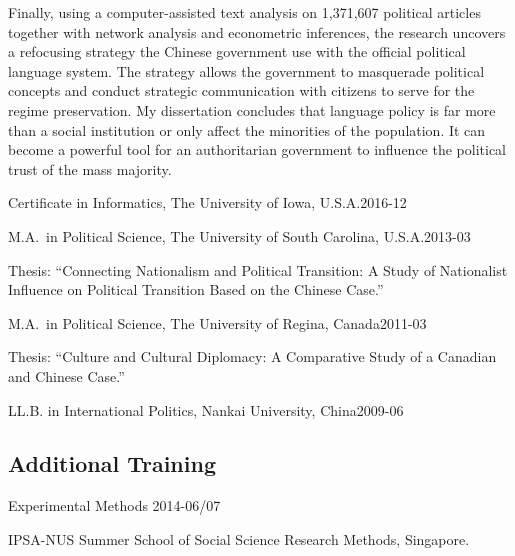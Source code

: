 \documentclass[10.5pt,]{article}
\providecommand{\tightlist}{%
	\setlength{\itemsep}{0pt}\setlength{\parskip}{0pt}}
\renewenvironment{itemize}{
	\begin{list}{}{
			\setlength{\leftmargin}{1.5em}
		}
	}{
	\end{list}
}
\begin{document}
\begin{itemize}
\begin{itemize}
\begin{itemize}
      Finally, using a computer-assisted text analysis on 1,371,607
      political articles together with network analysis and econometric
      inferences, the research uncovers a refocusing strategy the
      Chinese government use with the official political language
      system. The strategy allows the government to masquerade political
      concepts and conduct strategic communication with citizens to
      serve for the regime preservation. My dissertation concludes that
      language policy is far more than a social institution or only
      affect the minorities of the population. It can become a powerful
      tool for an authoritarian government to influence the political
      trust of the mass majority.
    \end{itemize}
  \end{itemize}
\item
  Certificate in Informatics, The University of Iowa,
  U.S.A.\hfill 2016-12
\item
  M.A.~in Political Science, The University of South Carolina,
  U.S.A.\hfill 2013-03

  \begin{itemize}
  \tightlist
  \item
    \footnotesize Thesis: ``Connecting Nationalism and Political
    Transition: A Study of Nationalist Influence on Political Transition
    Based on the Chinese Case.''
  \end{itemize}
\item
  M.A.~in Political Science, The University of Regina,
  Canada\hfill 2011-03

  \begin{itemize}
  \tightlist
  \item
    \footnotesize Thesis: ``Culture and Cultural Diplomacy: A
    Comparative Study of a Canadian and Chinese Case.''
  \end{itemize}
\item
  LL.B. in International Politics, Nankai University,
  China\hfill 2009-06
\end{itemize}

\subsection{Additional Training}\label{additional-training}

\begin{itemize}
\tightlist
\item
  Experimental Methods \hfill 2014-06/07

  \begin{itemize}
  \tightlist
  \item
    \footnotesize IPSA-NUS Summer School of Social Science Research
    Methods, Singapore.
  \end{itemize}
\end{itemize}
\end{document}
